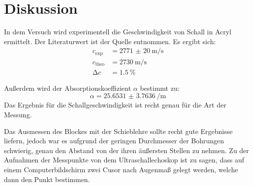 \section{Diskussion}
\label{sec:Diskussion}

In dem Versuch wird experimentell die Geschwindigkeit von Schall in Acryl ermittelt. Der Literaturwert ist der Quelle \cite{cA} entnommen.
Es ergibt sich:
\begin{align*}
    c_{\text{exp}}    &= \SI{2771(20)}{\metre\per\second} \\
    c_{\text{theo}}   &= \SI{2730}{\metre\per\second} \\
    \increment c      &= \SI{1.5}{\percent}
\end{align*}

\noindent Außerdem wird der Absorptionskoeffizient $\alpha $ bestimmt zu:
\begin{equation*}
    \alpha = \SI{25.6531(37636)}{\per\metre}
\end{equation*}
Das Ergebnis für die Schallgeschwindigkeit ist recht genau für die Art der Messung. 

\noindent Das Ausmessen des Blockes mit der Schieblehre sollte recht gute Ergebnisse liefern, jedoch war es aufgrund der geringen Durchmesser der Bohrungen schwierig, 
genau den Abstand von der ihren äußersten Stellen zu nehmen. Zu der Aufnahmen der Messpunkte von dem Ultraschallechoskop ist zu sagen, dass auf einem 
Computerbildschirm zwei Cusor nach Augenmaß gelegt werden, welche dann den Punkt bestimmen. 

